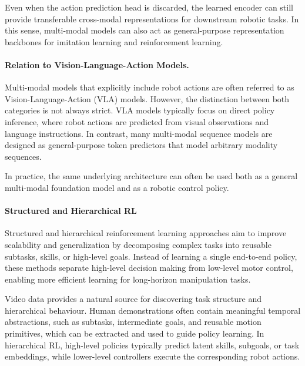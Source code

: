 Even when the action prediction head is discarded, the learned encoder can still provide transferable cross-modal representations for downstream robotic tasks. 
In this sense, multi-modal models can also act as general-purpose representation backbones for imitation learning and reinforcement learning.

\paragraph{Relation to Vision-Language-Action Models.}

Multi-modal models that explicitly include robot actions are often referred to as Vision-Language-Action (VLA) models. 
However, the distinction between both categories is not always strict. 
VLA models typically focus on direct policy inference, where robot actions are predicted from visual observations and language instructions. 
In contrast, many multi-modal sequence models are designed as general-purpose token predictors that model arbitrary modality sequences. 

In practice, the same underlying architecture can often be used both as a general multi-modal foundation model and as a robotic control policy.














\paragraph{Structured and Hierarchical RL}

Structured and hierarchical reinforcement learning approaches aim to improve scalability and generalization by decomposing complex tasks into reusable subtasks, skills, or high-level goals. Instead of learning a single end-to-end policy, these methods separate high-level decision making from low-level motor control, enabling more efficient learning for long-horizon manipulation tasks.

Video data provides a natural source for discovering task structure and hierarchical behaviour. Human demonstrations often contain meaningful temporal abstractions, such as subtasks, intermediate goals, and reusable motion primitives, which can be extracted and used to guide policy learning. In hierarchical RL, high-level policies typically predict latent skills, subgoals, or task embeddings, while lower-level controllers execute the corresponding robot actions.

